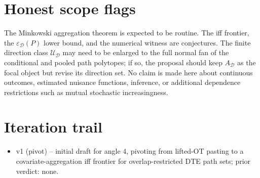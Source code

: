 \documentclass[11pt]{article}
\theoremstyle{definition}
\theoremstyle{plain}
\theoremstyle{remark}
\begin{document}
\section{Honest scope flags}
The Minkowski aggregation theorem is expected to be routine.  The iff frontier, the \(\varepsilon_{\mathcal D}(P)\) lower bound, and the numerical witness are conjectures.  The finite direction class \(\mathcal U_{\mathcal D}\) may need to be enlarged to the full normal fan of the conditional and pooled path polytopes; if so, the proposal should keep \(A_{\mathcal D}\) as the focal object but revise its direction set.  No claim is made here about continuous outcomes, estimated nuisance functions, inference, or additional dependence restrictions such as mutual stochastic increasingness.

\section{Iteration trail}
\begin{itemize}[leftmargin=*]
\item v1 (pivot) -- initial draft for angle 4, pivoting from lifted-OT pasting to a covariate-aggregation iff frontier for overlap-restricted DTE path sets; prior verdict: none.
\end{itemize}
\end{document}
